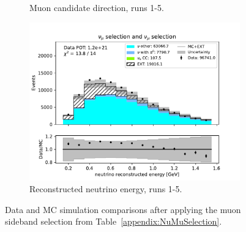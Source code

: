 \begin{figure}[H]
\begin{subfigure}{0.33\linewidth}
        \caption{Muon candidate direction, runs 1-5.}
    \end{subfigure}%
    \begin{subfigure}{0.33\linewidth}
        \captionsetup{width=0.7\linewidth}
        \includegraphics[width=\linewidth]{technote/Sidebands/Figures/NuMuSideband/muon_sideband_neutrino_energy_run1234a4b4c4d5_NUMU_NUMU.pdf}
        \caption{Reconstructed neutrino energy, runs 1-5.}
    \end{subfigure}
    \caption{Data and MC simulation comparisons after applying the muon sideband selection from Table~\ref{appendix:NuMuSelection}.}
    \label{fig:NuMuSideband}
\end{figure}